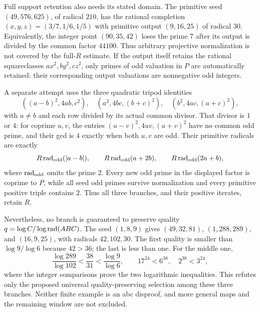 Full support retention also needs its stated domain. The primitive seed
$(49,576,625)$, of radical $210$, has the rational completion
$(x,y,z)=(3/7,1/6,1/5)$ with primitive output $(9,16,25)$ of radical $30$.
Equivalently, the integer point $(90,35,42)$ loses the prime $7$ after its
output is divided by the common factor $44100$. Thus arbitrary projective
normalization is not covered by the full-$R$ estimate. If the output
itself retains the rational squareclasses $ax^2,by^2,cz^2$, only primes
of odd valuation in $P$ are automatically retained: their corresponding
output valuations are nonnegative odd integers.

A separate attempt uses the three quadratic tripod identities
\[
 ((a-b)^2,4ab,c^2),\quad
 (a^2,4bc,(b+c)^2),\quad
 (b^2,4ac,(a+c)^2),
\]
with $a\ne b$ and each row divided by its actual common divisor.
That divisor is $1$ or $4$: for coprime $u,v$, the entries
$(u-v)^2,4uv,(u+v)^2$ have no common odd prime, and their gcd is $4$
exactly when both $u,v$ are odd. Their primitive radicals are exactly
\[
 R\operatorname{rad}_{\mathrm{odd}}(|a-b|),\qquad
 R\operatorname{rad}_{\mathrm{odd}}(a+2b),\qquad
 R\operatorname{rad}_{\mathrm{odd}}(2a+b),
\]
where $\operatorname{rad}_{\mathrm{odd}}$ omits the prime $2$. Every new odd prime in
the displayed factor is coprime to $P$, while all seed odd primes survive
normalization and every primitive positive triple contains $2$.
Thus all three branches, and their positive iterates, retain $R$.

Nevertheless, no branch is guaranteed to preserve quality
$q=\log C/\log\operatorname{rad}(ABC)$. The seed $(1,8,9)$ gives
$(49,32,81)$, $(1,288,289)$, and $(16,9,25)$, with radicals $42,102,30$.
The first quality is smaller than $\log9/\log6$ because $42>36$;
the last is less than one. For the middle one,
\[
 \frac{\log289}{\log102}<\frac{38}{31}<\frac{\log9}{\log6},
 \qquad 17^{24}<6^{38},\quad 2^{38}<3^{24},
\]
where the integer comparisons prove the two logarithmic inequalities.
This refutes only the proposed universal quality-preserving selection
among these three branches. Neither finite example is an abc disproof,
and more general maps and the remaining window are not excluded.
